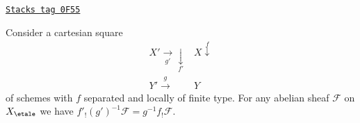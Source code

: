 \begin{lemma}
\label{more-etale-lemma-base-change-f-shriek-separated}
\href{https://stacks.math.columbia.edu/tag/0F55}{\texttt{Stacks tag 0F55}}

Consider a cartesian square
$$
\begin{array}{cc}X' \underset{g'}{\longrightarrow}\underset{f'}{\downarrow} & X \overset{f}{\downarrow} \\ Y' \overset{g}{\longrightarrow} & Y\end{array}
$$
of schemes with $f$ separated and locally of finite type.
For any abelian sheaf $\mathcal{F}$ on $X_\etale$ we have
$f'_!(g')^{-1}\mathcal{F} = g^{-1}f_!\mathcal{F}$.
\end{lemma}

